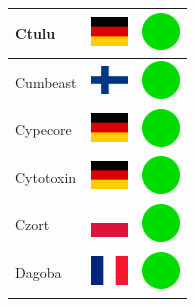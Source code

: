 \documentclass[12pt, a4paper, twoside]{report}
\begin{document}
\begin{center}
\begin{longtable}{|p{5cm}|p{2cm}|p{2cm}|}
 Ctulu                                                      & \includegraphics[width=1cm]{../img/flags/de} &   \includegraphics[width=1cm]{../likes/y} \\ \hline
 Cumbeast                                                   & \includegraphics[width=1cm]{../img/flags/fi} &   \includegraphics[width=1cm]{../likes/y} \\ \hline
 Cypecore                                                   & \includegraphics[width=1cm]{../img/flags/de} &   \includegraphics[width=1cm]{../likes/y} \\ \hline
 Cytotoxin                                                  & \includegraphics[width=1cm]{../img/flags/de} &   \includegraphics[width=1cm]{../likes/y} \\ \hline
 Czort                                                      & \includegraphics[width=1cm]{../img/flags/pl} &   \includegraphics[width=1cm]{../likes/y} \\ \hline
 Dagoba                                                     & \includegraphics[width=1cm]{../img/flags/fr} &   \includegraphics[width=1cm]{../likes/y} \\ \hline

\end{longtable}
\end{center}
\end{document}
